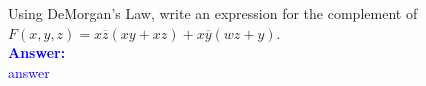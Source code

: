 \item{}
Using DeMorgan's Law, write an expression for the complement of\\[6pt]
$F(x,y,z)=x\overline{z}(xy+xz)+x\overline{y}(wz+y)$.\\[12pt]
\ifanswers
\textcolor{blue}{
\textbf{Answer:}\\
answer
}
\newpage
\fi

